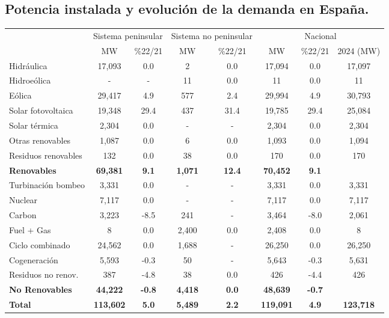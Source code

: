		\subsection{Potencia instalada y evolución de la demanda en España.}
			\begin{table}[htbp]
				\renewcommand{\arraystretch}{1.2}
				\centering
				\begin{tabular}{lcc|cc|ccc}
					& \multicolumn{2}{c|}{Sistema peninsular} & \multicolumn{2}{c|}{Sistema no peninsular} & \multicolumn{3}{c}{Nacional} \\
					\cline{2-8}
					& MW & \%22/21 & MW & \%22/21 & MW & \%22/21 & 2024 (MW)\\
					\hline
					Hidráulica & 17,093 & 0.0 & 2 & 0.0 & 17,094 & 0.0 & 17,097 \\
					Hidroeólica & - & - & 11 & 0.0 & 11 & 0.0 & 11\\
					Eólica & 29,417 & 4.9 & 577 & 2.4 & 29,994 & 4.9 & 30,793 \\
					Solar fotovoltaica & 19,348 & 29.4 & 437 & 31.4 & 19,785 & 29.4 & 25,084\\
					Solar térmica & 2,304 & 0.0 & - & - & 2,304 & 0.0 & 2,304\\
					Otras renovables & 1,087 & 0.0 & 6 & 0.0 & 1,093 & 0.0 & 1,094\\
					Residuos renovables & 132 & 0.0 & 38 & 0.0 & 170 & 0.0 & 170\\
					\textbf{Renovables} & \textbf{69,381} & \textbf{9.1} & \textbf{1,071} & \textbf{12.4} & \textbf{70,452} & \textbf{9.1} & \\
					Turbinación bombeo & 3,331 & 0.0 & - & - & 3,331 & 0.0 & 3,331\\
					Nuclear & 7,117 & 0.0 & - & - & 7,117 & 0.0 & 7,117\\
					Carbon & 3,223 & -8.5 & 241 & - & 3,464 & -8.0 & 2,061\\
					Fuel + Gas & 8 & 0.0 & 2,400 & 0.0 & 2,408 & 0.0 & 8\\
					Ciclo combinado & 24,562 & 0.0 & 1,688 & - & 26,250 & 0.0 & 26,250\\
					Cogeneración & 5,593 & -0.3 & 50 & - & 5,643 & -0.3 & 5,631\\
					Residuos no renov. & 387 & -4.8 & 38 & 0.0 & 426 & -4.4 & 426\\
					\textbf{No Renovables} & \textbf{44,222} & \textbf{-0.8} & \textbf{4,418} & \textbf{0.0} & \textbf{48,639} & \textbf{-0.7} & \\
					\hline
					\textbf{Total} & \textbf{113,602} & \textbf{5.0} & \textbf{5,489} & \textbf{2.2} & \textbf{119,091} & \textbf{4.9} & \textbf{123,718}\\
				\end{tabular}
			\end{table}


